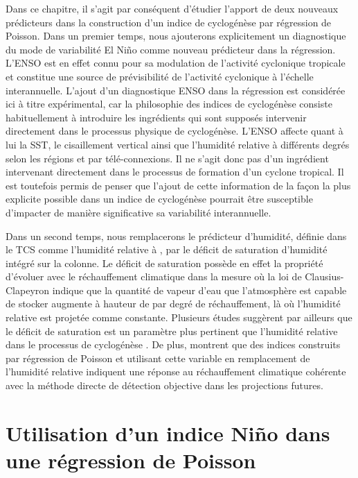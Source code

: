\documentclass[../main.tex]{subfiles}
\begin{document}
Dans ce chapitre, il s'agit par conséquent d'étudier l'apport de deux nouveaux prédicteurs dans la construction d'un indice de cyclogénèse par régression de
Poisson. Dans un premier temps, nous ajouterons explicitement un diagnostique du mode de variabilité El Niño comme nouveau prédicteur dans la régression. L'ENSO
est en effet connu pour sa modulation de l'activité cyclonique tropicale \parencite{chan_tropical_1985,landsea_ninosouthern_2000,lin_enso_2020} et constitue
une source de prévisibilité de l'activité cyclonique à l'échelle interannuelle. L'ajout d'un diagnostique ENSO dans la régression est considérée ici à titre
expérimental, car la philosophie des indices de cyclogénèse consiste habituellement à introduire les ingrédients qui sont supposés intervenir directement dans
le processus physique de cyclogénèse. L'ENSO affecte quant à lui la SST, le cisaillement vertical ainsi que l'humidité relative à différents degrés selon les
régions et par télé-connexions. Il ne s'agit donc pas d'un ingrédient intervenant directement dans le processus de formation d'un cyclone tropical. Il est
toutefois permis de penser que l'ajout de cette information de la façon la plus explicite possible dans un indice de cyclogénèse pourrait être susceptible
d'impacter de manière significative sa variabilité interannuelle.

Dans un second temps, nous remplacerons le prédicteur d'humidité, définie dans le TCS comme l'humidité relative à , par le déficit de saturation
d'humidité intégré sur la colonne. Le déficit de saturation possède en effet la propriété d'évoluer avec le réchauffement climatique dans la mesure où la loi de
Clausius-Clapeyron indique que la quantité de vapeur d'eau que l'atmosphère est capable de stocker augmente à hauteur de  par degré de réchauffement, là
où l'humidité relative est projetée comme constante. Plusieurs études suggèrent par ailleurs que le déficit de saturation est un paramètre plus pertinent que
l'humidité relative dans le processus de cyclogénèse \parencite{emanuel_hurricanes_2008,emanuel_tropical_2010}. De plus, \textcite{camargo_testing_2014}
montrent que des indices construits par régression de Poisson et utilisant cette variable en remplacement de l'humidité relative indiquent une réponse au
réchauffement climatique cohérente avec la méthode directe de détection objective dans les projections futures.

\section{Utilisation d'un indice Niño dans une régression de Poisson}\label{sec:indice_ONI}
\end{document}
